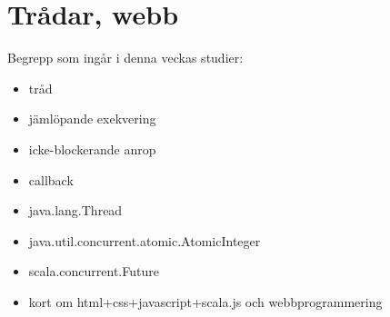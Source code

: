 \chapter{Trådar, webb}\label{chapter:W12}
Begrepp som ingår i denna veckas studier:
\begin{itemize}[noitemsep,label={$\square$},leftmargin=*]
\item tråd
\item jämlöpande exekvering
\item icke-blockerande anrop
\item callback
\item java.lang.Thread
\item java.util.concurrent.atomic.AtomicInteger
\item scala.concurrent.Future
\item kort om html+css+javascript+scala.js och webbprogrammering\end{itemize}
